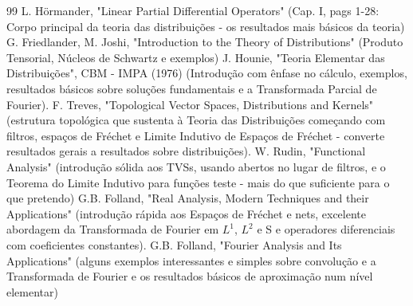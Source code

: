 \documentclass[12pt]{article}
\theoremstyle{definition} %
\begin{document}
\begin{thebibliography}{99}
	 L. Hörmander, "Linear Partial Differential Operators" (Cap. I, pags 1-28: Corpo principal da teoria das distribuições - os resultados mais básicos da teoria)
	 G. Friedlander, M. Joshi, "Introduction to the Theory of Distributions" (Produto Tensorial,  Núcleos de Schwartz e exemplos)
	 J. Hounie, "Teoria Elementar das Distribuições", CBM - IMPA (1976) (Introdução com ênfase no cálculo, exemplos, resultados básicos sobre soluções fundamentais e a Transformada Parcial de Fourier).
	 F. Treves, "Topological Vector Spaces, Distributions and Kernels" (estrutura topológica que sustenta à Teoria das Distribuições começando com filtros, espaços de Fréchet e Limite Indutivo de Espaços de Fréchet - converte resultados gerais a resultados sobre distribuições).
	 W. Rudin, "Functional Analysis" (introdução sólida aos TVSs, usando abertos no lugar de filtros, e o Teorema do Limite Indutivo para funções teste - mais do que suficiente para o que pretendo)
	 G.B. Folland, "Real Analysis, Modern Techniques and their Applications" (introdução rápida aos Espaços de Fréchet e nets, excelente abordagem da Transformada de Fourier em \(L^1\), \(L^2\) e S e operadores diferenciais com coeficientes constantes).
	 G.B. Folland, "Fourier Analysis and Its Applications" (alguns exemplos interessantes e simples sobre convolução e a Transformada de Fourier e os resultados básicos de aproximação num nível elementar)
\end{thebibliography}
\end{document}
